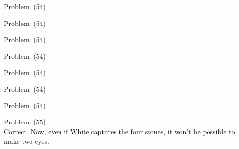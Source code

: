 \documentclass[11pt]{article}
\begin{document}
\begin{minipage}[t]{0.5\textwidth}
  {\centering
  
  Problem: (54)\\
  
  }
\end{minipage}
\begin{minipage}[t]{0.5\textwidth}
  {\centering
  
  Problem: (54)\\
  
  }
\end{minipage}
\begin{minipage}[t]{0.5\textwidth}
  {\centering
  
  Problem: (54)\\
  
  }
\end{minipage}
\begin{minipage}[t]{0.5\textwidth}
  {\centering
  
  Problem: (54)\\
  
  }
\end{minipage}
\begin{minipage}[t]{0.5\textwidth}
  {\centering
  
  Problem: (54)\\
  
  }
\end{minipage}
\begin{minipage}[t]{0.5\textwidth}
  {\centering
  
  Problem: (54)\\
  
  }
\end{minipage}
\begin{minipage}[t]{0.5\textwidth}
  {\centering
  
  Problem: (54)\\
  
  }
\end{minipage}
\begin{minipage}[t]{0.5\textwidth}
  {\centering
  
  Problem: (55)\\
  Correct. Now, even if White captures the four stones, it won't be possible to make two eyes.\\
  }
\end{minipage}
\end{document}

